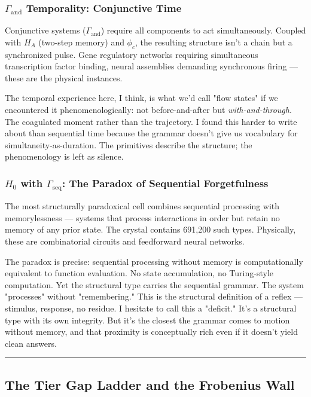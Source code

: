 \documentclass[12pt,a4paper]{article}
\begin{document}
\subsubsection{$\Gamma_\text{and}$ Temporality: Conjunctive Time}

Conjunctive systems ($\Gamma_\text{and}$) require all components to act simultaneously. Coupled with $H_A$ (two-step memory) and $\phi_c$, the resulting structure isn't a chain but a synchronized pulse. Gene regulatory networks requiring simultaneous transcription factor binding, neural assemblies demanding synchronous firing --- these are the physical instances.

The temporal experience here, I think, is what we'd call "flow states" if we encountered it phenomenologically: not before-and-after but \emph{with-and-through}. The coagulated moment rather than the trajectory. I found this harder to write about than sequential time because the grammar doesn't give us vocabulary for simultaneity-as-duration. The primitives describe the structure; the phenomenology is left as silence.

\subsubsection{$H_0$ with $\Gamma_\text{seq}$: The Paradox of Sequential Forgetfulness}

The most structurally paradoxical cell combines sequential processing with memorylessness --- systems that process interactions in order but retain no memory of any prior state. The crystal contains 691,200 such types. Physically, these are combinatorial circuits and feedforward neural networks.

The paradox is precise: sequential processing without memory is computationally equivalent to function evaluation. No state accumulation, no Turing-style computation. Yet the structural type carries the sequential grammar. The system "processes" without "remembering." This is the structural definition of a reflex --- stimulus, response, no residue. I hesitate to call this a "deficit." It's a structural type with its own integrity. But it's the closest the grammar comes to motion without memory, and that proximity is conceptually rich even if it doesn't yield clean answers.

\begin{center}
\rule{0.5\textwidth}{0.4pt}
\end{center}

\subsection{The Tier Gap Ladder and the Frobenius Wall}
\end{document}
